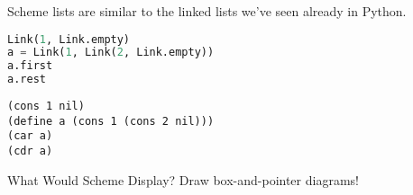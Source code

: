 Scheme lists are similar to the linked lists we've seen already in Python.

\begin{minipage}{0.5\linewidth}
\begin{lstlisting}[language=Python, linewidth=\linewidth]
Link(1, Link.empty)
a = Link(1, Link(2, Link.empty))
a.first
a.rest
\end{lstlisting}
\end{minipage}
\begin{minipage}{0.5\linewidth}
\begin{lstlisting}[linewidth=\linewidth]
(cons 1 nil)
(define a (cons 1 (cons 2 nil)))
(car a)
(cdr a)
\end{lstlisting}
\end{minipage}

\question What Would Scheme Display? Draw box-and-pointer diagrams!

